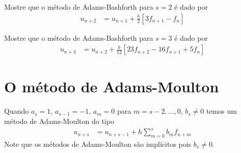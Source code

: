 \begin{exer}
Mostre que o método de Adams-Bashforth para $s=2$ é dado por
\begin{eqnarray}\label{AB2}
  u_{n+2}  &= u_{n+1}  + \frac{h}{2} [3 f_{n+1} -f_{n}]
\end{eqnarray}
\end{exer}

\begin{exer}
Mostre que o método de Adams-Bashforth para $s=3$ é dado por
\begin{eqnarray}\label{AB3}
  u_{n+3}  &= u_{n+2}  + \frac{h}{12} [23f_{n+2}-16 f_{n+1} +5f_{n}]
\end{eqnarray}
\end{exer}



\section{O método de Adams-Moulton}
Quando $a_s=1$, $a_{s-1}=-1$, $a_m=0$ para $m=s-2,\ldots ,0$, $b_s\neq 0$ temos um método de Adams-Moulton do tipo
\begin{eqnarray}\label{AM}
  u_{n+s}  &= u_{n+s-1}  + h \sum_{m=0}^{s} b_m f_{n+m}
\end{eqnarray}
Note que os métodos de Adams-Moulton são implícitos pois $b_s\neq 0$.



